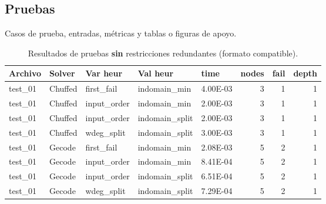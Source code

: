 
\subsection{Pruebas}\label{sec:04-acertijo-logico-pruebas}
Casos de prueba, entradas, métricas y tablas o figuras de apoyo.


\begin{compactfloats}
\begin{table}[H]
  \centering
  \small
  \setlength{\tabcolsep}{10.8pt}
  \caption{Resultados de pruebas \textbf{sin} restricciones redundantes (formato compatible).}
  \label{tab:pruebas-acertijo-off}
  \begin{tabular}{l l l l l r r r}
    \toprule
    \textbf{Archivo} & \textbf{Solver} & \textbf{Var heur} & \textbf{Val heur} & \textbf{time} & \textbf{nodes} & \textbf{fail} & \textbf{depth} \\
    \midrule
    test\_01 & Chuffed  &  first\_fail  &  indomain\_min & 4.00E-03 & 3 & 1 & 1 \\
    test\_01 & Chuffed  & input\_order  &  indomain\_min & 2.00E-03 & 3 & 1 & 1 \\
    test\_01 & Chuffed  & input\_order  & indomain\_split & 2.00E-03 & 3 & 1 & 1 \\
    test\_01 & Chuffed  &  wdeg\_split  & indomain\_split & 3.00E-03 & 3 & 1 & 1 \\
    test\_01 & Gecode  &  first\_fail  &  indomain\_min & 2.08E-03 & 5 & 2 & 1 \\
    test\_01 & Gecode  & input\_order  &  indomain\_min & 8.41E-04 & 5 & 2 & 1 \\
    test\_01 & Gecode  & input\_order  & indomain\_split & 6.51E-04 & 5 & 2 & 1 \\
    test\_01 & Gecode  &  wdeg\_split  & indomain\_split & 7.29E-04 & 5 & 2 & 1 \\
    \bottomrule
  \end{tabular}
\end{table}

\end{compactfloats}